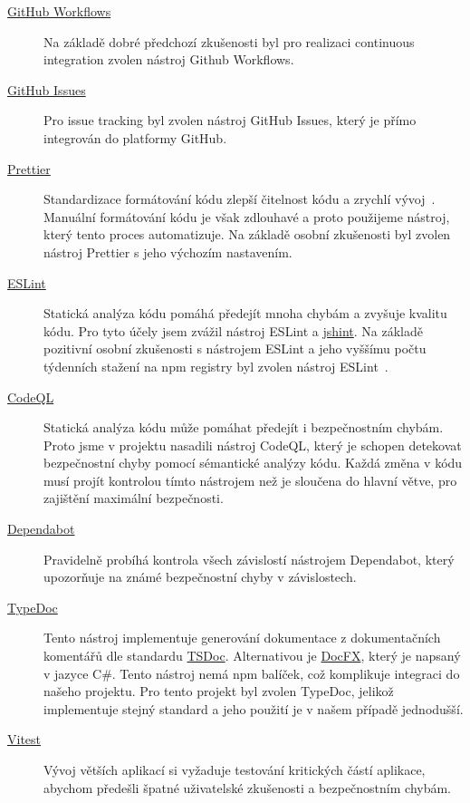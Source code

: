 \begin{description}
    \item[\href{https://github.com/features/actions}{GitHub Workflows}]
    Na základě dobré předchozí zkušenosti byl pro realizaci continuous integration zvolen nástroj Github Workflows.
    \item[\href{https://github.com/features/issues}{GitHub Issues}]
    Pro issue tracking byl zvolen nástroj GitHub Issues, který je přímo integrován do platformy GitHub.
    \item[\href{https://prettier.io/}{Prettier}]
    Standardizace formátování kódu zlepší čitelnost kódu a zrychlí vývoj~\cite{why-coding-style-matters}.
    Manuální formátování kódu je však zdlouhavé a proto použijeme nástroj, který tento proces automatizuje.
    Na základě osobní zkušenosti byl zvolen nástroj Prettier s jeho výchozím nastavením.
    \item[\href{https://eslint.org/}{ESLint}]
    Statická analýza kódu pomáhá předejít mnoha chybám a zvyšuje kvalitu kódu.
    Pro tyto účely jsem zvážil nástroj ESLint a \href{https://www.npmjs.com/package/jshint}{jshint}.
    Na základě pozitivní osobní zkušenosti s nástrojem ESLint a jeho vyššímu počtu týdenních stažení na npm registry byl zvolen nástroj ESLint~\cite{eslint, jshint}.
    \item[\href{https://codeql.github.com/}{CodeQL}]
    Statická analýza kódu může pomáhat předejít i bezpečnostním chybám.
    Proto jsme v projektu nasadili nástroj CodeQL, který je schopen detekovat bezpečnostní chyby pomocí sémantické analýzy kódu.
    Každá změna v kódu musí projít kontrolou tímto nástrojem než je sloučena do hlavní větve, pro zajištění maximální bezpečnosti.
    \item[\href{https://github.com/dependabot}{Dependabot}]
    Pravidelně probíhá kontrola všech závislostí nástrojem Dependabot, který upozorňuje na známé bezpečnostní chyby v závislostech.
    \item[\href{https://typedoc.org/}{TypeDoc}]
    Tento nástroj implementuje generování dokumentace z dokumentačních komentářů dle standardu \href{https://tsdoc.org/}{TSDoc}.
    Alternativou je \href{https://github.com/dotnet/docfx}{DocFX}, který je napsaný v jazyce C\#.
    Tento nástroj nemá npm balíček, což komplikuje integraci do našeho projektu.
    Pro tento projekt byl zvolen TypeDoc, jelikož implementuje stejný standard a jeho použití je v našem případě jednodušší.
    \item[\href{https://vitest.dev/}{Vitest}]
    Vývoj větších aplikací si vyžaduje testování kritických částí aplikace, abychom předešli špatné uživatelské zkušenosti a bezpečnostním chybám.

\end{description}
